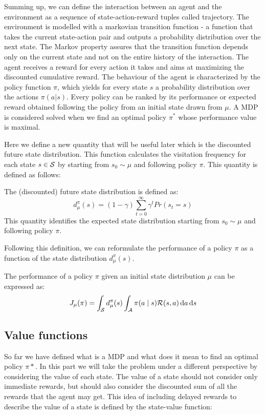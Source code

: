 Summing up, we can define the interaction between an agent and the environment as a sequence of state-action-reward tuples called trajectory. The environment is modelled with a markovian transition function - a function that takes the current state-action pair and outputs a probability distribution over the next state. The Markov property assures that the transition function depends only on the current state and not on the entire history of the interaction. The agent receives a reward for every action it takes and aims at maximizing the discounted cumulative reward. The behaviour of the agent is characterized by the policy function $\pi$, which yields for every state $s$ a probability distribution over the actions $\pi(a|s)$. Every policy can be ranked by its performance or expected reward obtained following the policy from an initial state drawn from $\mu$. A MDP is considered solved when we find an optimal policy $\pi^*$ whose performance value is maximal.

Here we define a new quantity that will be useful later which is the discounted future state distribution. This function calculates the visitation frequency for each state $s\in\mathcal{S}$ by starting from $s_0\sim\mu$ and following policy $\pi$. This quantity is defined as follows:
\begin{definition}
The (discounted) future state distribution is defined as: 
\[
d_{\mu}^{\pi}(s) = (1-\gamma)\sum_{t=0}^{\infty} \gamma^t Pr(s_t = s)
\]
This quantity identifies the expected state distribution starting from $s_0 \sim \mu$ and following policy $\pi$. 
\end{definition}

Following this definition, we can reformulate the performance of a policy $\pi$ as a function of the state distribution $d_\mu^\pi(s)$.

\begin{definition}
The performance of a policy $\pi$ given an initial state distribution $\mu$ can be expressed as: 
\begin{equation*}
J_{\mu}(\pi) = \int_{\mathcal{S}} d_{\mu}^{\pi}(s) \int_{\mathcal{A}} \pi(a \mid s) \mathcal{R}(s,a) \, \textrm{d} a \, \textrm{d} s
\end{equation*}
\end{definition}


\subsection{Value functions}
So far we have defined what is a MDP and what does it mean to find an optimal policy $\pi*$. In this part we will take the problem under a different perspective by considering the value of each state. The value of a state should not consider only immediate rewards, but should also consider the discounted sum of all the rewards that the agent may get. This idea of including delayed rewards to describe the value of a state is defined by the state-value function:

